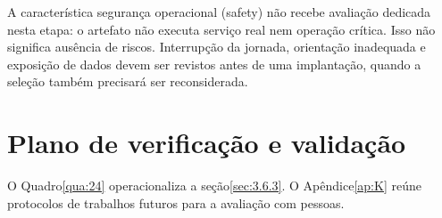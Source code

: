 \begin{apendicesenv}
A característica segurança operacional (safety) não recebe avaliação dedicada nesta etapa: o artefato não executa serviço real nem operação crítica. Isso não significa ausência de riscos. Interrupção da jornada, orientação inadequada e exposição de dados devem ser revistos antes de uma implantação, quando a seleção também precisará ser reconsiderada.

\section{Plano de verificação e validação}
\label{sec:I.2}

O Quadro\nobreakspace{}\ref{qua:24} operacionaliza a seção\nobreakspace{}\ref{sec:3.6.3}. O Apêndice\nobreakspace{}\ref{ap:K} reúne protocolos de trabalhos futuros para a avaliação com pessoas.


\end{apendicesenv}
